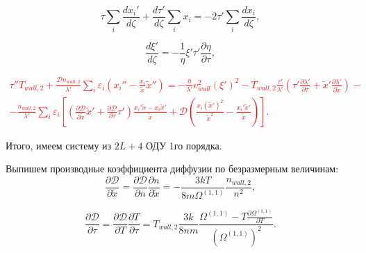\documentclass[12pt]{article}
\begin{document}
\begin{equation}
  \tau \sum_{i}\frac{d x_{i}'}{d \zeta} + \frac{d \tau'}{d \zeta}\sum_{i}x_{i} = -2\tau'\sum_{i}\frac{d x_{i}}{d \zeta},
\end{equation}

\begin{equation}
  \frac{d \xi'}{d\zeta} = -\frac{1}{\eta} \xi' \tau' \frac{\partial \eta}{\partial \tau},
\end{equation}

\textcolor{red}{
\begin{multline}
  \tau''T_{wall,2} + \frac{\mathcal{D}n_{wall,2}}{\lambda'}\sum_{i}\varepsilon_{i}\left(x_{i}'' - \frac{x_{i}}{\tilde{x}}\tilde{x}'' \right) = -\frac{\eta}{\lambda'} v_{wall}^2 \left(\xi' \right)^2 - T_{wall,2}\frac{\tau'}{\lambda'} \left(\tau' \frac{\partial \lambda'}{\partial \tau} + \tilde{x}' \frac{\partial \lambda'}{\partial \tilde{x}} \right) - \\
  - \frac{n_{wall,2}}{\lambda'}\sum_{i}\varepsilon_{i} \left[\left(\frac{\partial \mathcal{D}}{\partial \tilde{x}}\tilde{x}' + \frac{\partial \mathcal{D}}{\partial \tau}\tau' \right) \frac{x_{i}'\tilde{x} - x_{i}\tilde{x}'}{\tilde{x}} + \mathcal{D}\left(\frac{x_{i}\left(\tilde{x}'\right)^2}{\tilde{x}^2} - \frac{x_{i}'\tilde{x}'}{\tilde{x}} \right)  \right].\label{T-sts-final-dimless}
\end{multline}
}

Итого, имеем систему из $2L+4$ ОДУ 1го порядка.

Выпишем производные коэффициента диффузии по безразмерным величинам:
\begin{equation}
  \frac{\partial \mathcal{D}}{\partial \tilde{x}} = \frac{\partial \mathcal{D}}{\partial n}\frac{\partial n}{\partial \tilde{x}} = -\frac{3kT}{8m\Omega^{(1,1)}} \frac{n_{wall,2}}{n^2},
\end{equation}

\begin{equation}
  \frac{\partial \mathcal{D}}{\partial \tau} = \frac{\partial \mathcal{D}}{\partial T}\frac{\partial T}{\partial \tau} = T_{wall,2}\frac{3k}{8nm} \frac{\Omega^{(1,1)} - T \frac{\partial \Omega^{(1,1)}}{\partial T}}{\left(\Omega^{(1,1)}\right)^2}.
\end{equation}
\end{document}
